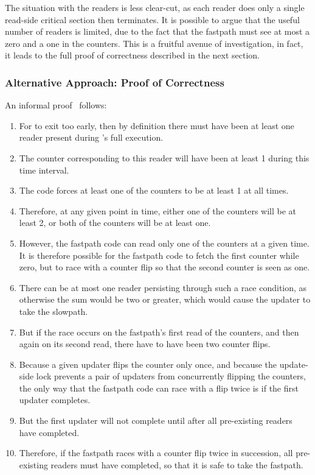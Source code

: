 The situation with the readers is less clear-cut, as each reader
does only a single read-side critical section then terminates.
It is possible to argue that the useful number of readers is limited,
due to the fact that the fastpath must see at most a zero and a one
in the counters.
This is a fruitful avenue of investigation, in fact, it leads to
the full proof of correctness described in the next section.

\subsubsection{Alternative Approach: Proof of Correctness}
\label{sec:formal:Alternative Approach: Proof of Correctness}

An informal proof~\cite{PaulMcKenney2007QRCUpatch}
follows:

\begin{enumerate}
\item	For  to exit too early, then
	by definition there must have been at least one reader
	present during 's full
	execution.
\item	The counter corresponding to this reader will have been
	at least 1 during this time interval.
\item	The  code forces at least one
	of the counters to be at least 1 at all times.
\item	Therefore, at any given point in time, either one of the
	counters will be at least 2, or both of the counters will
	be at least one.
\item	However, the  fastpath code
	can read only one of the counters at a given time.
	It is therefore possible for the fastpath code to fetch
	the first counter while zero, but to race with a counter
	flip so that the second counter is seen as one.
\item	There can be at most one reader persisting through such
	a race condition, as otherwise the sum would be two or
	greater, which would cause the updater to take the slowpath.
\item	But if the race occurs on the fastpath's first read of the
	counters, and then again on its second read, there have
	to have been two counter flips.
\item	Because a given updater flips the counter only once, and
	because the update-side lock prevents a pair of updaters
	from concurrently flipping the counters, the only way that
	the fastpath code can race with a flip twice is if the
	first updater completes.
\item	But the first updater will not complete until after all
	pre-existing readers have completed.
\item	Therefore, if the fastpath races with a counter flip
	twice in succession, all pre-existing readers must have
	completed, so that it is safe to take the fastpath.
\end{enumerate}

